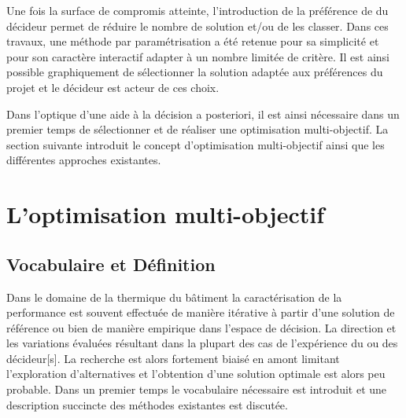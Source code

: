 Une fois la surface de compromis atteinte, l’introduction de la préférence de
du décideur permet de réduire le nombre de solution et/ou de les classer.
Dans ces travaux, une méthode par paramétrisation a été retenue pour sa simplicité
et pour son caractère interactif adapter à un nombre limitée de critère. Il est
ainsi possible graphiquement de sélectionner la solution adaptée aux préférences
du projet et le décideur est acteur de ces choix.

Dans l’optique d’une aide à la décision a posteriori, il est ainsi nécessaire
dans un premier temps de sélectionner et de réaliser une optimisation multi-objectif.
La section suivante introduit le concept d’optimisation multi-objectif ainsi que
les différentes approches existantes.



\section{L’optimisation multi-objectif} %
\label{sec:l_optimisation_multi_objectif}
\subsection{Vocabulaire et Définition} %
\label{sub:vocabulaire_et_definition}
Dans le domaine de la thermique du bâtiment la caractérisation
de la performance est souvent effectuée de manière itérative à partir d’une solution
de référence ou bien de manière empirique dans l’espace de décision. La direction et
les variations évaluées résultant dans la plupart des cas de l’expérience du ou des
décideur[s]. La recherche est alors fortement biaisé en amont limitant l’exploration
d’alternatives et l’obtention d’une solution optimale est alors peu probable.
Dans un premier temps le vocabulaire nécessaire est introduit et une description
succincte des méthodes existantes est discutée.

